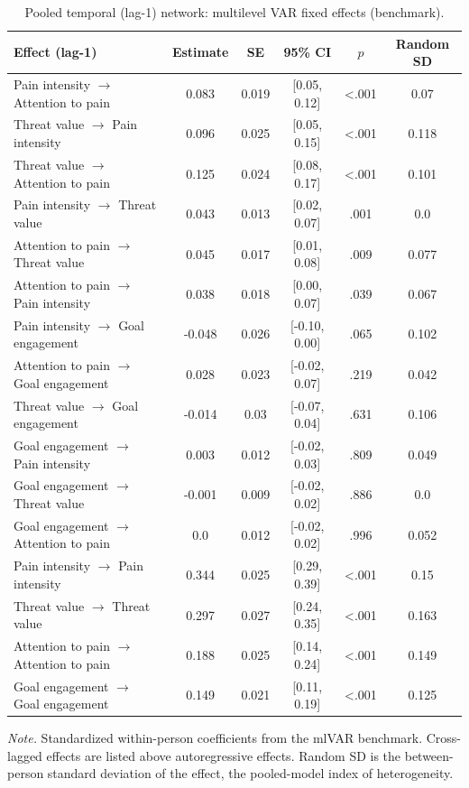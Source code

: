 \begin{table}[H]
\raggedright
\caption{Pooled temporal (lag-1) network: multilevel VAR fixed effects (benchmark).}
\label{tab:temporal}
\footnotesize
\begingroup
\setlength{\tabcolsep}{4pt}
\renewcommand{\arraystretch}{1.08}
\noindent
\begin{tabular*}{\textwidth}{@{\extracolsep{\fill}}lccccc@{}}
\toprule
Effect (lag-1) & Estimate & SE & 95\% CI & $p$ & Random SD \\
\midrule
Pain intensity $\rightarrow$ Attention to pain & 0.083 & 0.019 & [0.05, 0.12] & <.001 & 0.07 \\
Threat value $\rightarrow$ Pain intensity & 0.096 & 0.025 & [0.05, 0.15] & <.001 & 0.118 \\
Threat value $\rightarrow$ Attention to pain & 0.125 & 0.024 & [0.08, 0.17] & <.001 & 0.101 \\
Pain intensity $\rightarrow$ Threat value & 0.043 & 0.013 & [0.02, 0.07] & .001 & 0.0 \\
Attention to pain $\rightarrow$ Threat value & 0.045 & 0.017 & [0.01, 0.08] & .009 & 0.077 \\
Attention to pain $\rightarrow$ Pain intensity & 0.038 & 0.018 & [0.00, 0.07] & .039 & 0.067 \\
Pain intensity $\rightarrow$ Goal engagement & -0.048 & 0.026 & [-0.10, 0.00] & .065 & 0.102 \\
Attention to pain $\rightarrow$ Goal engagement & 0.028 & 0.023 & [-0.02, 0.07] & .219 & 0.042 \\
Threat value $\rightarrow$ Goal engagement & -0.014 & 0.03 & [-0.07, 0.04] & .631 & 0.106 \\
Goal engagement $\rightarrow$ Pain intensity & 0.003 & 0.012 & [-0.02, 0.03] & .809 & 0.049 \\
Goal engagement $\rightarrow$ Threat value & -0.001 & 0.009 & [-0.02, 0.02] & .886 & 0.0 \\
Goal engagement $\rightarrow$ Attention to pain & 0.0 & 0.012 & [-0.02, 0.02] & .996 & 0.052 \\
Pain intensity $\rightarrow$ Pain intensity & 0.344 & 0.025 & [0.29, 0.39] & <.001 & 0.15 \\
Threat value $\rightarrow$ Threat value & 0.297 & 0.027 & [0.24, 0.35] & <.001 & 0.163 \\
Attention to pain $\rightarrow$ Attention to pain & 0.188 & 0.025 & [0.14, 0.24] & <.001 & 0.149 \\
Goal engagement $\rightarrow$ Goal engagement & 0.149 & 0.021 & [0.11, 0.19] & <.001 & 0.125 \\
\bottomrule
\end{tabular*}
\par\vspace{3pt}\noindent\parbox{\textwidth}{\footnotesize\textit{Note.} Standardized within-person coefficients from the mlVAR benchmark. Cross-lagged effects are listed above autoregressive effects. Random SD is the between-person standard deviation of the effect, the pooled-model index of heterogeneity.}
\endgroup
\end{table}

